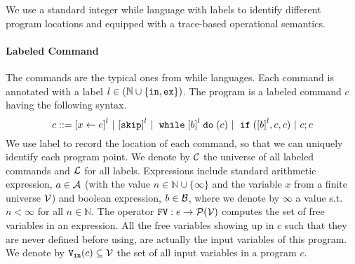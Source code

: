 We use a standard integer while language with labels to identify different program locations and equipped with a  trace-based operational semantics.
\paragraph{Labeled Command}
The commands are the typical ones from while languages. Each command is annotated with a label $l \in (\mathbb{N} \cup \{\mathtt{in}, \mathtt{ex}\})$. The program is a labeled command $c$ having the following syntax. 
\[
{c} ::= 
\clabel{\assign{x}{\expr}}^l 
~|~  \clabel{\eskip}^l
~|~ \ewhile \clabel{\bexpr}^{l} \edo ({c})
~|~ \eif(\clabel{\bexpr}^{l} , {c}, {c}) 
~|~ {c};{c} 
\]
We use label to record
the location of each command, so that we can uniquely identify each program point.
We denote by $\mathcal{C}$ the universe of all labeled commands and $\mathcal{L}$ for all labels.
Expressions include
standard arithmetic expression, $a \in \mathcal{A}$ (with the value $n \in \mathbb{N} \cup \{ \infty\}$ and the variable $x$ from a finite universe $\mathcal{V}$) and boolean expression, $b \in \mathcal{B}$, where we denote by $\infty$ a value s.t. $n < \infty $ for all $n \in \mathbb{N}$.
The operator $\mathtt{FV}: e \to \mathcal{P}(\mathcal{V})$ computes the set of free variables in an expression.
All the free variables
showing up in $c$ such that they are never defined before using, are actually the input variables of this program.
We denote by
${\mathtt{V_{\mathtt{in}}}}(c) \subseteq \mathcal{V}$ the set of all input variables in a program $c$.


